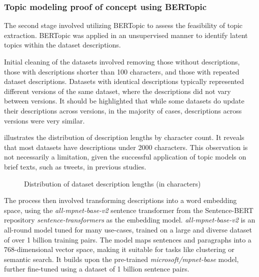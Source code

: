 \documentclass{article}
\begin{document}
\subsubsection{Topic modeling proof of concept using BERTopic}

The second stage involved utilizing BERTopic to assess the feasibility of topic extraction. BERTopic was applied in an unsupervised manner to identify latent topics within the dataset descriptions.

Initial cleaning of the datasets involved removing those without descriptions, those with descriptions shorter than 100 characters, and those with repeated dataset descriptions. Datasets with identical descriptions typically represented different versions of the same dataset, where the descriptions did not vary between versions. It should be highlighted that while some datasets do update their descriptions across versions, in the majority of cases, descriptions across versions were very similar.

 illustrates the distribution of description lengths by character count. It reveals that most datasets have descriptions under 2000 characters. This observation is not necessarily a limitation, given the successful application of topic models on brief texts, such as tweets, in previous studies.

\begin{figure}[h] %
    \centering
    
    \caption{Distribution of dataset description lengths (in characters)}
    \label{fig:description_length_histogram}
\end{figure}

The process then involved transforming descriptions into a word embedding space, using the \textit{all-mpnet-base-v2} \cite{noauthor_sentence-transformersall-mpnet-base-v2_2024} sentence transformer from the Sentence-BERT repository \cite{reimers_sentence-bert_2019} \textit{sentence-transformers} as the embedding model. \textit{all-mpnet-base-v2} is an all-round model tuned for many use-cases, trained on a large and diverse dataset of over 1 billion training pairs. The model maps sentences and paragraphs into a 768-dimensional vector space, making it suitable for tasks like clustering or semantic search. It builds upon the pre-trained \textit{microsoft/mpnet-base} \cite{noauthor_microsoftmpnet-base_nodate} model, further fine-tuned using a dataset of 1 billion sentence pairs.
\end{document}
